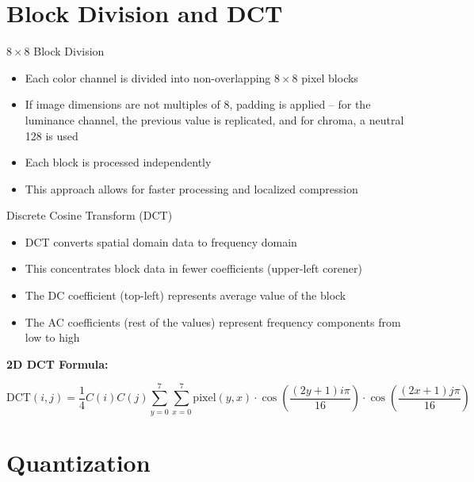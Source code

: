\documentclass[10pt]{beamer}
\begin{document}
\section{Block Division and DCT}

\begin{frame}{$8\times8$ Block Division}
    \begin{itemize}
     \item Each color channel is divided into non-overlapping $8\times8$ pixel blocks
     \item If image dimensions are not multiples of 8, padding is applied -- for the luminance channel, the previous value is replicated, and for chroma, a neutral 128 is used
     \item Each block is processed independently
     \item This approach allows for faster processing and localized compression
    \end{itemize}
\end{frame}

\begin{frame}{Discrete Cosine Transform (DCT)}
    \begin{itemize}
     \item DCT converts spatial domain data to frequency domain
     \item This concentrates block data in fewer coefficients (upper-left corener)
     \item The DC coefficient (top-left) represents average value of the block
     \item The AC coefficients (rest of the values) represent frequency components from low to high
    \end{itemize}

    \vspace{1cm}
    \textbf{2D DCT Formula:}
    \begin{small}
     $$\text{DCT}(i,j) = \frac{1}{4}C(i)C(j)\sum_{y=0}^{7}\sum_{x=0}^{7}\text{pixel}(y,x) \cdot \cos\left(\frac{(2y+1)i\pi}{16}\right) \cdot \cos\left(\frac{(2x+1)j\pi}{16}\right)$$

    \end{small}


\end{frame}


\section{Quantization}
\end{document}
